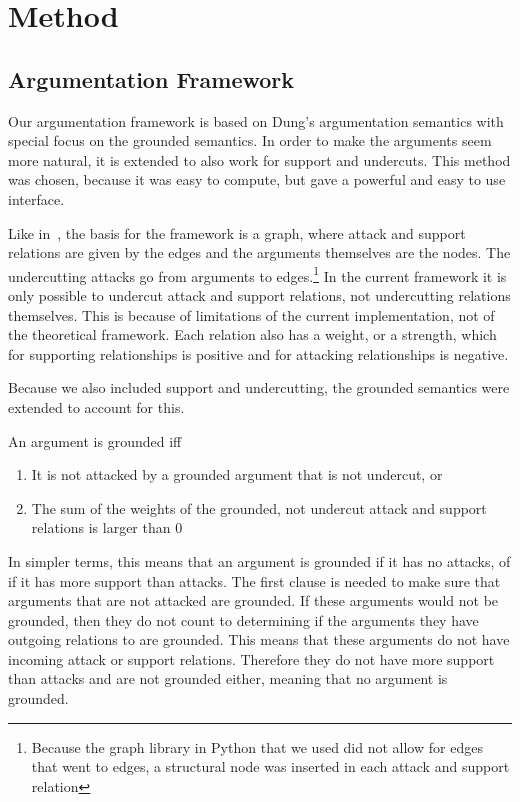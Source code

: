 \section{Method}

\subsection{Argumentation Framework}
Our argumentation framework is based on Dung's argumentation semantics
\cite{dungargfund} with special focus on the grounded semantics. In order
to make the arguments seem more natural, it is extended to also work for
support and undercuts. This method was chosen, because it was easy to
compute, but gave a powerful and easy to use interface.

Like in~\cite{dungargfund}, the basis for the framework is a graph, where
attack and support relations are given by the edges and the arguments
themselves are the nodes. The undercutting attacks go from arguments to
edges.\footnote{Because the graph library in Python that we used did not
    allow for edges that went to edges, a structural node was inserted in
    each attack and support relation} 
In the current framework it is only
possible to undercut attack and support relations, not undercutting
relations themselves. This is because of limitations of the current
implementation, not of the theoretical framework. Each relation also has a
weight, or a strength, which for supporting relationships is positive and
for attacking relationships is negative.

Because we also included support and undercutting, the grounded semantics
were extended to account for this.
\begin{defn}
    An argument is grounded iff
    \begin{enumerate}
        \item It is not attacked by a grounded argument that is not
            undercut, or
        \item The sum of the weights of the grounded, not undercut attack
            and support relations is larger than 0
    \end{enumerate}
\end{defn}

In simpler terms, this means that an argument is grounded if it has no
attacks, of if it has more support than attacks. The first clause is needed
to make sure that arguments that are not attacked are grounded. If these
arguments would not be grounded, then they do not count to determining if
the arguments they have outgoing relations to are grounded. This means that these
arguments do not have incoming attack or support relations. Therefore they
do not have more support than attacks and are not grounded either, meaning
that no argument is grounded. 

